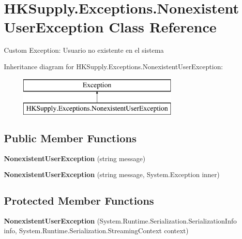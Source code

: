 \hypertarget{class_h_k_supply_1_1_exceptions_1_1_nonexistent_user_exception}{}\section{H\+K\+Supply.\+Exceptions.\+Nonexistent\+User\+Exception Class Reference}
\label{class_h_k_supply_1_1_exceptions_1_1_nonexistent_user_exception}


Custom Exception\+: Usuario no existente en el sistema  


Inheritance diagram for H\+K\+Supply.\+Exceptions.\+Nonexistent\+User\+Exception\+:\begin{figure}[H]
\begin{center}
\leavevmode
\includegraphics[height=2.000000cm]{class_h_k_supply_1_1_exceptions_1_1_nonexistent_user_exception}
\end{center}
\end{figure}
\subsection*{Public Member Functions}
\begin{DoxyCompactItemize}
\item 
\mbox{\label{class_h_k_supply_1_1_exceptions_1_1_nonexistent_user_exception_af1065c421ce7b33b35099c62f271835b}} 
{\bfseries Nonexistent\+User\+Exception} (string message)
\item 
\mbox{\label{class_h_k_supply_1_1_exceptions_1_1_nonexistent_user_exception_a9d9fd303806bc5c901c13b1ef20bebcb}} 
{\bfseries Nonexistent\+User\+Exception} (string message, System.\+Exception inner)
\end{DoxyCompactItemize}
\subsection*{Protected Member Functions}
\begin{DoxyCompactItemize}
\item 
\mbox{\label{class_h_k_supply_1_1_exceptions_1_1_nonexistent_user_exception_a0545e8560fe9bfdf9fb67c0ed5c04b83}} 
{\bfseries Nonexistent\+User\+Exception} (System.\+Runtime.\+Serialization.\+Serialization\+Info info, System.\+Runtime.\+Serialization.\+Streaming\+Context context)
\end{DoxyCompactItemize}



